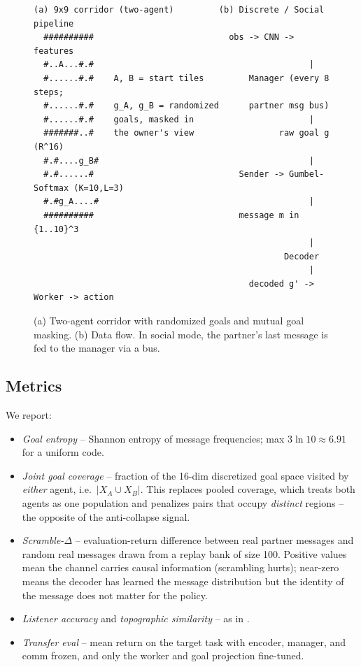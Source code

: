 \documentclass{article}
\begin{document}
\begin{figure}[t]
\centering
\small
\begin{verbatim}
(a) 9x9 corridor (two-agent)         (b) Discrete / Social pipeline
  ##########                           obs -> CNN -> features
  #..A...#.#                                           |
  #......#.#    A, B = start tiles         Manager (every 8 steps;
  #......#.#    g_A, g_B = randomized      partner msg bus)
  #......#.#    goals, masked in                       |
  #######..#    the owner's view                 raw goal g (R^16)
  #.#....g_B#                                          |
  #.#......#                             Sender -> Gumbel-Softmax (K=10,L=3)
  #.#g_A....#                                          |
  ##########                             message m in {1..10}^3
                                                       |
                                                  Decoder
                                                       |
                                           decoded g' -> Worker -> action
\end{verbatim}
\caption{(a) Two-agent corridor with randomized goals and mutual goal
masking. (b) Data flow. In social mode, the partner's last message is
fed to the manager via a bus.}
\label{fig:arch}
\end{figure}

\subsection{Metrics}

We report:
\begin{itemize}[nosep,leftmargin=*]
\item \emph{Goal entropy} -- Shannon entropy of message frequencies; max
$3\ln 10 \approx 6.91$ for a uniform code.
\item \emph{Joint goal coverage} -- fraction of the 16-dim discretized
goal space visited by \emph{either} agent, i.e.\ $|X_A \cup X_B|$. This
replaces pooled coverage, which treats both agents as one population and
penalizes pairs that occupy \emph{distinct} regions -- the opposite of
the anti-collapse signal.
\item \emph{Scramble-$\Delta$} -- evaluation-return difference between
real partner messages and random real messages drawn from a replay bank
of size 100. Positive values mean the channel carries causal information
(scrambling hurts); near-zero means the decoder has learned the message
distribution but the identity of the message does not matter for the
policy.
\item \emph{Listener accuracy} and \emph{topographic similarity} -- as in
\citet{lowe2017maddpg,chaabouni2020compositionality}.
\item \emph{Transfer eval} -- mean return on the target task with
encoder, manager, and comm frozen, and only the worker and goal
projection fine-tuned.
\end{itemize}
\end{document}
